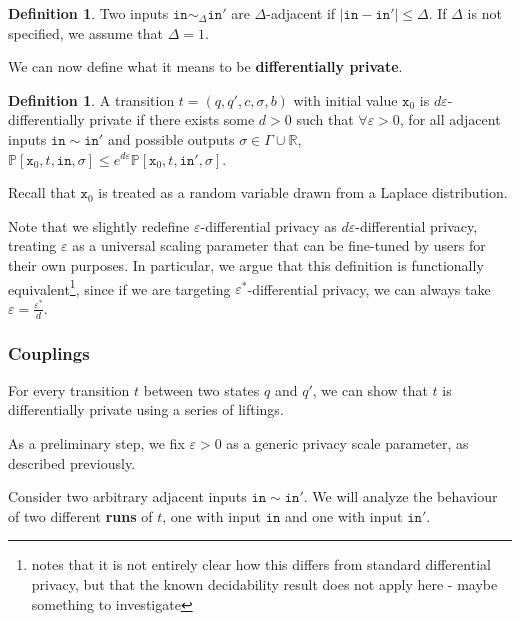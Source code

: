 \documentclass[12pt]{article}
\newcommand{\RR}{\mathbb{R}}
\newcommand{\PP}{\mathbb{P}}
\theoremstyle{definition}
\newtheorem{defn}[thm]{Definition}
\begin{document}
\begin{defn}
    Two inputs $\texttt{in}\sim_{\Delta} \texttt{in}'$ are $\Delta$-adjacent if $|\texttt{in}-\texttt{in}'|\leq \Delta$. If $\Delta$ is not specified, we assume that $\Delta = 1$. 
\end{defn}

We can now define what it means  to be \textbf{differentially private}.

\begin{defn}
    A transition $t=(q, q', c, \sigma, b)$ with initial value $\texttt{x}_0$ is $d\varepsilon$-differentially private if there exists some $d>0$ such that $\forall \varepsilon> 0$, for all adjacent inputs $\texttt{in}\sim \texttt{in}'$ and possible outputs $\sigma\in \Gamma\cup\RR$, $\PP[\texttt{x}_0, t, \texttt{in}, \sigma]\leq e^{d\varepsilon}\PP[\texttt{x}_0, t, \texttt{in}', \sigma]$. 

    Recall that $\texttt{x}_0$ is treated as a random variable drawn from a Laplace distribution. 
\end{defn}

Note that we slightly redefine $\varepsilon$-differential privacy as $d\varepsilon$-differential privacy, treating $\varepsilon$ as a universal scaling parameter that can be fine-tuned by users for their own purposes. 
In particular, we argue that this definition is functionally equivalent\footnote{\cite{chadhaLinearTimeDecidability2021} notes that it is not entirely clear how this differs from standard differential privacy, but that the known decidability result does not apply here - {\color{red} maybe something to investigate}}, since if we are targeting $\varepsilon^*$-differential privacy, we can always take $\varepsilon = \frac{\varepsilon^*}{d}$.

\subsubsection{Couplings}

For every transition $t$ between two states $q$ and $q'$, we can show that $t$ is differentially private using a series of liftings. 

As a preliminary step, we fix $\varepsilon>0$ as a generic privacy scale parameter, as described previously.

Consider two arbitrary adjacent inputs $\texttt{in}\sim \texttt{in}'$. We will analyze the behaviour of two different \textbf{runs} of $t$, one with input $\texttt{in}$ and one with input $\texttt{in}'$. 
\end{document}
